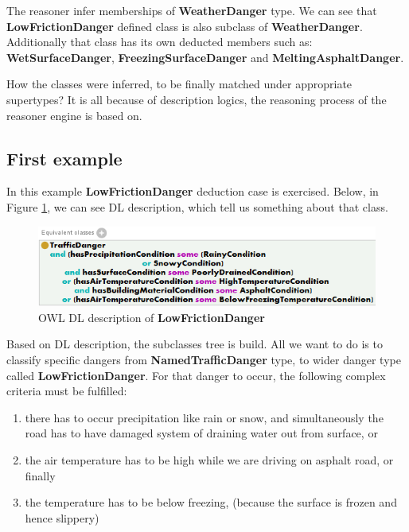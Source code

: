\noindent The reasoner infer memberships of \textbf{WeatherDanger} type. We can see that \textbf{LowFrictionDanger} defined class is also subclass of \textbf{WeatherDanger}. Additionally that class has its own deducted members such as: \textbf{WetSurfaceDanger}, \textbf{FreezingSurfaceDanger} and \textbf{MeltingAsphaltDanger}.

How the classes were inferred, to be finally matched under appropriate supertypes? It is all because of description logics, the reasoning process of the reasoner engine is based on.

\subsection{First example}
\label{sub:firstExample}

In this example \textbf{LowFrictionDanger} deduction case is exercised. Below, in Figure \ref{fig:lowFrictionDanger}, we can see DL description, which tell us something about that class.

\medskip

\begin{figure}[htp]
\centering
\includegraphics[scale=0.7]{images/chapter3/LowFrictionDanger}
\caption{OWL DL description of \textbf{LowFrictionDanger}}
\label{fig:lowFrictionDanger}
\end{figure}

\noindent Based on DL description, the subclasses tree is build. All we want to do is to classify specific dangers from \textbf{NamedTrafficDanger} type, to wider danger type called \textbf{LowFrictionDanger}. For that danger to occur, the following complex criteria must be fulfilled:

\newpage
\begin{enumerate}
    \setlength{\itemsep}{0cm}
    \setlength{\parskip}{0cm}

    \item there has to occur precipitation like rain or snow, and simultaneously the road has to have damaged system of draining water out from surface, or
    \item the air temperature has to be high while we are driving on asphalt road, or finally
    \item the temperature has to be below freezing, (because the surface is frozen and hence slippery)
\end{enumerate}

